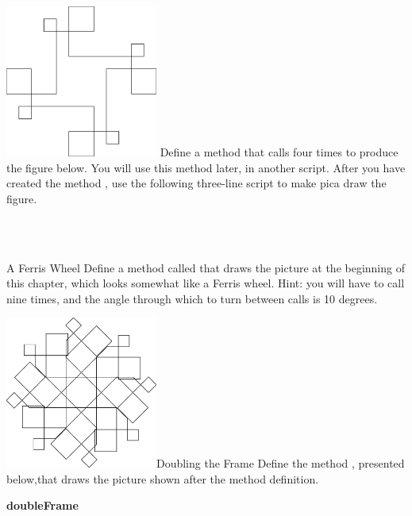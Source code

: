 \documentclass[a4paper,10pt,twoside]{book}
\begin{document}
\begin{exofigwithsize}[0.5]{\includegraphics[width=5cm]{compCompleteThing}}{}\label{xp:131}
Define a method  that calls  four times to produce the figure below. You will use this method 
later, in another script. After you have created the method , use the following three-line script to make 
pica draw the figure.


 \\
 \\

\end{exofigwithsize}


\begin{exonofigtitle}{A Ferris Wheel}
Define a method called  that draws the picture at the beginning of this chapter, which looks 
somewhat like a Ferris wheel. Hint: you will have to call  nine times, and the angle through which to turn 
between calls is 10 degrees. 
\end{exonofigtitle}


\begin{exofigwithsize}[0.5]{\includegraphics[width=5cm]{compArtNouveauGiantScr}}{Doubling the Frame}\label{xp:133}
Define the method , presented below,that draws the picture shown after the method definition. 


\textbf{doubleFrame}\\
 \\
\ct{[ self pattern.} \\
 \\
\ct{self go: 100 ]} 
\end{exofigwithsize}
\end{document}
